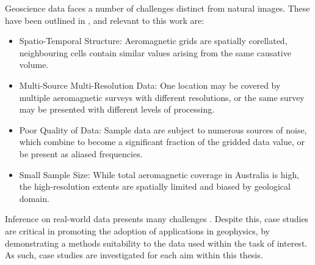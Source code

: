 \documentclass[manuscript.tex]{subfiles}
\begin{document}
Geoscience data faces a number of challenges distinct from natural images. These have been outlined in \textcite{karpatneMachineLearningGeosciences2019}, and relevant to this work are:
\begin{itemize}
    \item{} Spatio-Temporal Structure: Aeromagnetic grids are spatially corellated, neighbouring cells contain similar values arising from the same causative volume.
    \item{} Multi-Source Multi-Resolution Data: One location may be covered by multiple aeromagnetic surveys with different resolutions, or the same survey may be presented with different levels of processing.
    \item{} Poor Quality of Data: Sample data are subject to numerous sources of noise, which combine to become a significant fraction of the gridded data value, or be present as aliased frequencies.
    \item{} Small Sample Size: While total aeromagnetic coverage in Australia is high, the high-resolution extents are spatially limited and biased by geological domain.
\end{itemize}

Inference on real-world data presents many challenges \parencite{nikolenkoSyntheticDataDeep2021,tremblayTrainingDeepNetworks2018}.
Despite this, case studies are critical in promoting the adoption of applications in geophysics, by demonstrating a methods suitability to the data used within the task of interest.
As such, case studies are investigated for each aim within this thesis.
\end{document}
